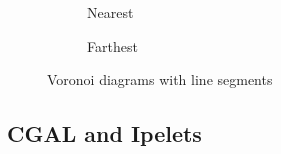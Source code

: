 \documentclass[11pt,a4paper,english]{article}
\begin{document}
	\begin{figure}[h]
    \centering
    \begin{subfigure}[b]{0.45\textwidth}
        \caption{Nearest\label{fig:SVD_example}}
    \end{subfigure}
	\qquad
    \begin{subfigure}[b]{0.45\textwidth}
        \caption{Farthest\label{fig:FSVD_example}}
    \end{subfigure}
    \caption{Voronoi diagrams with line segments\label{fig:examples}}
	\end{figure}
	
	\subsection{CGAL and Ipelets}
	
\end{document}
